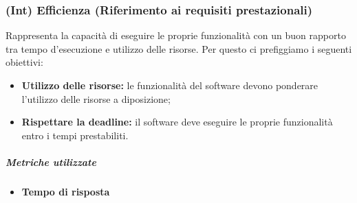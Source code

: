 \subsubsection{(Int) Efficienza (Riferimento ai requisiti prestazionali)}
Rappresenta la capacità di eseguire le proprie funzionalità con un buon rapporto tra tempo d'esecuzione e utilizzo delle risorse. Per questo ci prefiggiamo i seguenti obiettivi:
\begin{itemize}
	\item \textbf{Utilizzo delle risorse:} le funzionalità del software devono ponderare l'utilizzo delle risorse a diposizione;
	\item \textbf{Rispettare la deadline:} il software deve eseguire le proprie funzionalità entro i tempi prestabiliti.
\end{itemize}
\vspace{0.8cm}
\subparagraph{Metriche utilizzate}
\begin{itemize}
	\item \textbf{Tempo di risposta}
\end{itemize}
\begin{table}[!htpb]
	\centering
	\renewcommand{\arraystretch}{2} 
	\caption{Metriche utilizzate Efficienza}
\end{table}
